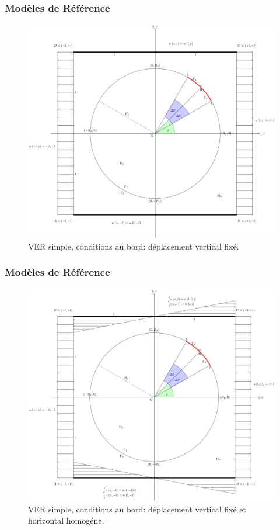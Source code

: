 \documentclass[first,firstsupp,lastsupp,handout,last,hyperref,table]{ETHclass}
\begin{document}
\begin{frame}
\frametitle{Mod\`eles de R\'ef\'erence}
\vspace{-0.25cm}
\centering
\begin{figure}
\centering
\includegraphics[height=0.7\textheight]{LEFM2DsRVEsFsDdepverdispBCULappAxialDispLR.pdf}
\caption{\scriptsize VER simple, conditions au bord: d\'eplacement vertical fix\'e.}
\label{fig:singleRVE-rigid}
\end{figure}
\end{frame}

\begin{frame}
\frametitle{Mod\`eles de R\'ef\'erence}
\vspace{-0.25cm}
\centering
\begin{figure}
\centering
\includegraphics[height=0.7\textheight]{LEFM2DsRVEsFsDhomoBCULappAxialDispLR.pdf}
\caption{\scriptsize VER simple, conditions au bord: d\'eplacement vertical fix\'e et horizontal homog\'ene.}
\label{fig:singleRVE-homo}
\end{figure}
\end{frame}
\end{document}
